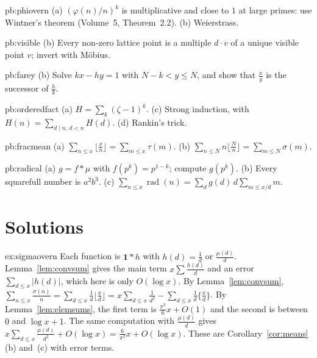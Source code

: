 \begin{hint}{pb:phiovern}
(a) $(\varphi(n)/n)^k$ is multiplicative and close to $1$ at large primes: use Wintner's theorem (Volume~5, Theorem~2.2).
(b) Weierstrass.
\end{hint}

\begin{hint}{pb:visible}
(b) Every non-zero lattice point is a multiple $d\cdot v$ of a unique visible point $v$; invert with Möbius.
\end{hint}

\begin{hint}{pb:farey}
(b) Solve $kx-hy=1$ with $N-k<y\le N$, and show that $\frac xy$ is the successor of $\frac hk$.
\end{hint}

\begin{hint}{pb:orderedfact}
(a) $H=\sum_k(\zeta-1)^k$. (c) Strong induction, with $H(n)=\sum_{d\mid n,\,d<n}H(d)$. (d) Rankin's trick.
\end{hint}

\begin{hint}{pb:fracmean}
(a) $\sum_{n\le x}\lfloor\frac xn\rfloor=\sum_{m\le x}\tau(m)$. (b) $\sum_{n\le N}n\lfloor\frac Nn\rfloor=\sum_{m\le N}\sigma(m)$.
\end{hint}

\begin{hint}{pb:radical}
(a) $g=f*\mu$ with $f(p^k)=p^{1-k}$; compute $g(p^k)$. (b) Every squarefull number is $a^2b^3$. (c) $\sum_{n\le x}\operatorname{rad}(n)=\sum_dg(d)\,d\sum_{m\le x/d}m$.
\end{hint}

\section{Solutions}

\begin{solution}{ex:sigmaovern}
\idea Each function is $\mathbf1*h$ with $h(d)=\frac1d$ or $\frac{\mu(d)}d$. Lemma~\ref{lem:convsum} gives the main term $x\sum\frac{h(d)}d$ and an error
$\sum_{d\le x}|h(d)|$, which here is only $O(\log x)$.
\writeup By Lemma~\ref{lem:convsum}, $\sum_{n\le x}\frac{\sigma(n)}n=\sum_{d\le x}\frac1d\lfloor\frac xd\rfloor=x\sum_{d\le x}\frac1{d^2}-\sum_{d\le x}\frac1d\{\frac xd\}$. By Lemma~\ref{lem:elemsums},
the first term is $\frac{\pi^2}6x+O(1)$ and the second is between $0$ and $\log x+1$. The same computation with $\frac{\mu(d)}d$ gives
$x\sum_{d\le x}\frac{\mu(d)}{d^2}+O(\log x)=\frac6{\pi^2}x+O(\log x)$. These are Corollary~\ref{cor:means}(b) and~(c) with error terms.
\end{solution}


